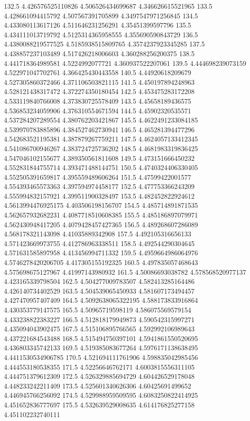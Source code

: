 132.5 4.426576525110826 4.506526434699687 4.346626615521965
133.5 4.428661094415792 4.507567391705899 4.3497547971256845
134.5 4.433080113617126 4.511646231256291 4.35451399597796
135.5 4.434111013719792 4.5125314365958555 4.355690590843729
136.5 4.4380088219577525 4.5185938515809765 4.3574237923345285
137.5 4.438857237103489 4.517426218006603 4.360288256200375
138.5 4.441718364989581 4.5224992077721 4.360937522207061
139.5 4.444698239073159 4.522971047702761 4.366425430443558
140.5 4.44920618209679 4.527305860372466 4.371106503821115
141.5 4.450197894248963 4.528121438317472 4.372274350180454
142.5 4.453475283172208 4.533119840766008 4.373830725578409
143.5 4.45658189436575 4.536853234059906 4.376310554671594
144.5 4.45902320535571 4.537284207289554 4.380762203421867
145.5 4.4622491233084185 4.539970783885896 4.384527462730941
146.5 4.465281394477296 4.542683521195381 4.387879267759211
147.5 4.4624057133412345 4.541086700946267 4.383724725736202
148.5 4.4681983319836425 4.547046102155677 4.389350561811608
149.5 4.473151666450232 4.552831844755714 4.393471488144751
150.5 4.4740324406330405 4.552505391659817 4.395559489606264
151.5 4.47599422001577 4.554393465573363 4.397594974458177
152.5 4.477753366243209 4.555994832157921 4.399511900328497
153.5 4.482452822924612 4.5613994476925175 4.403506198156707
154.5 4.485714891871535 4.562657932682231 4.4087718510608385
155.5 4.485186897079971 4.562430948417205 4.4079428457427365
156.5 4.489268607286089 4.568178321143098 4.41035889342908
157.5 4.492105316656133 4.571423669973755 4.412786963338511
158.5 4.492544290304645 4.571631585897958 4.413456994711332
159.5 4.4959664986064976 4.5746278420206705 4.417305155192325
160.5 4.497835057468643 4.575698675127967 4.41997143980932
161.5 4.50086693038782 4.578568520977137 4.423165339798504
162.5 4.504277009783507 4.582413285164486 4.426140734402529
163.5 4.504539065450933 4.581607173494457 4.427470957407409
164.5 4.5092638065322195 4.588173833916864 4.430353779147575
165.5 4.50965719598119 4.586075569579154 4.433238822383227
166.5 4.512818179949873 4.590542315997271 4.435094043902475
167.5 4.515106895766565 4.592992106989643 4.437221684543488
168.5 4.515494750397101 4.5941861550520695 4.436803345742133
169.5 4.519385083677264 4.5976171138638495 4.4411530534906785
170.5 4.521694111761906 4.598835042985456 4.444553180538355
171.5 4.52256646762171 4.6003815556311105 4.444751379612309
172.5 4.526329885694729 4.604426529178048 4.448233242211409
173.5 4.525601340626306 4.60425691499652 4.446945766256092
174.5 4.529988959509595 4.6083250822414925 4.451652836777697
175.5 4.532639529008635 4.614176825277158 4.451102232740111
